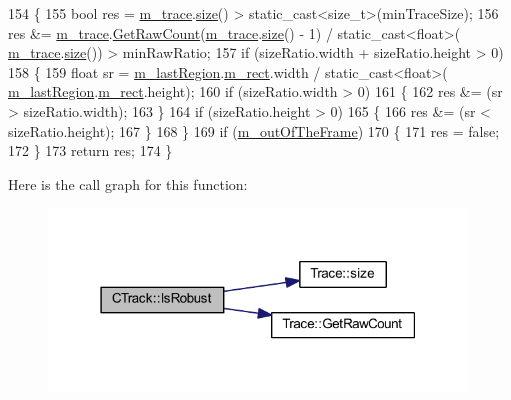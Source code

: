 \begin{DoxyCode}
154 \{
155     \textcolor{keywordtype}{bool} res = \mbox{\hyperlink{class_c_track_adf88ff8678ec928ac3ca764f7308b96f}{m\_trace}}.\mbox{\hyperlink{class_trace_a1bc7111ffb39ba415c2553677fc2f3ba}{size}}() > \textcolor{keyword}{static\_cast<}\textcolor{keywordtype}{size\_t}\textcolor{keyword}{>}(minTraceSize);
156     res &= \mbox{\hyperlink{class_c_track_adf88ff8678ec928ac3ca764f7308b96f}{m\_trace}}.\mbox{\hyperlink{class_trace_abef223bff681cc1165abfeb80c4f1267}{GetRawCount}}(\mbox{\hyperlink{class_c_track_adf88ff8678ec928ac3ca764f7308b96f}{m\_trace}}.\mbox{\hyperlink{class_trace_a1bc7111ffb39ba415c2553677fc2f3ba}{size}}() - 1) / static\_cast<float>(
      \mbox{\hyperlink{class_c_track_adf88ff8678ec928ac3ca764f7308b96f}{m\_trace}}.\mbox{\hyperlink{class_trace_a1bc7111ffb39ba415c2553677fc2f3ba}{size}}()) > minRawRatio;
157     \textcolor{keywordflow}{if} (sizeRatio.width + sizeRatio.height > 0)
158     \{
159         \textcolor{keywordtype}{float} sr = \mbox{\hyperlink{class_c_track_a5af91fbfad7ebf07bd0f681f915e440c}{m\_lastRegion}}.\mbox{\hyperlink{class_c_region_a6f68304e90428db829cc38792fa3e1e8}{m\_rect}}.width / \textcolor{keyword}{static\_cast<}\textcolor{keywordtype}{float}\textcolor{keyword}{>}(
      \mbox{\hyperlink{class_c_track_a5af91fbfad7ebf07bd0f681f915e440c}{m\_lastRegion}}.\mbox{\hyperlink{class_c_region_a6f68304e90428db829cc38792fa3e1e8}{m\_rect}}.height);
160         \textcolor{keywordflow}{if} (sizeRatio.width > 0)
161         \{
162             res &= (sr > sizeRatio.width);
163         \}
164         \textcolor{keywordflow}{if} (sizeRatio.height > 0)
165         \{
166             res &= (sr < sizeRatio.height);
167         \}
168     \}
169     \textcolor{keywordflow}{if} (\mbox{\hyperlink{class_c_track_ad97c3e53969dbb60e7690c4f2d038172}{m\_outOfTheFrame}})
170     \{
171         res = \textcolor{keyword}{false};
172     \}
173     \textcolor{keywordflow}{return} res;
174 \}
\end{DoxyCode}
Here is the call graph for this function\+:\nopagebreak
\begin{figure}[H]
\begin{center}
\leavevmode
\includegraphics[width=315pt]{class_c_track_a925ad52d3067abad455e2419610a286f_cgraph}
\end{center}
\end{figure}
\mbox{\label{class_c_track_a4f3265c10e4ad24b8b7b10668edfa309}} 
